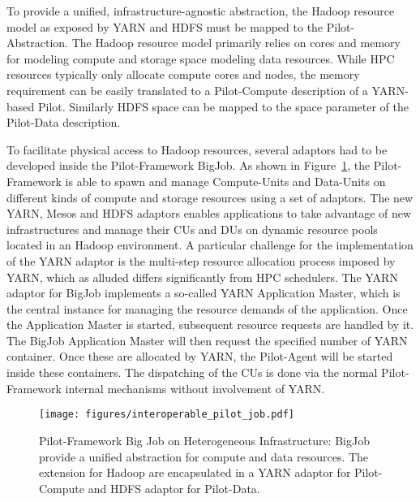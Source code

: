 \documentclass{sig-alternate}
\newcommand{\pilot}{Pilot\xspace}
\newcommand{\pilotcompute}{Pilot-Compute\xspace}
\newcommand{\pilotdata}{Pilot-Data\xspace}
\newcommand{\computeunits}{Compute-Units\xspace}
\newcommand{\dataunits}{Data-Units\xspace}
\newcommand{\dus}{DUs\xspace}
\newcommand{\cus}{CUs\xspace}
\begin{document}
To provide a unified, infrastructure-agnostic abstraction, the Hadoop resource
model as exposed by YARN and HDFS must be mapped to the \pilot-Abstraction. The
Hadoop resource model primarily relies on cores and memory for modeling compute
and storage space modeling data resources. While HPC resources typically only
allocate compute cores and nodes, the memory requirement can be easily
translated to a \pilotcompute description of a YARN-based \pilot. Similarly 
HDFS space can be mapped to the space parameter of the \pilotdata description. 



To facilitate physical access to Hadoop resources, several adaptors had to be
developed inside the \pilot-Framework BigJob. As shown in
Figure~\ref{fig:figures_interoperable_pilot_job}, the \pilot-Framework is able
to spawn and manage \computeunits and \dataunits on different kinds of compute
and storage resources using a set of adaptors. The new YARN, Mesos and HDFS
adaptors enables applications to take advantage of new infrastructures and
manage their \cus and \dus on dynamic resource pools located in an Hadoop
environment. A particular challenge for the implementation of the YARN adaptor
is the multi-step resource allocation process imposed by YARN, which as alluded
differs significantly from HPC schedulers. The YARN adaptor for BigJob
implements a so-called YARN Application Master, which is the central instance
for managing the resource demands of the application. Once the Application
Master is started, subsequent resource requests are handled by it. The BigJob
Application Master will then request the specified number of YARN container.
Once these are allocated by YARN, the \pilot-Agent will be started inside these
containers. The dispatching of the \cus is done via the normal \pilot-Framework
internal mechanisms without involvement of YARN.



\begin{figure}[t]
    \centering
    \texttt{[image: figures/interoperable\_pilot\_job.pdf]}
    \caption{\pilot-Framework Big Job on Heterogeneous Infrastructure: BigJob 
    provide a unified abstraction for compute and data resources. The extension 
    for Hadoop are encapsulated in a YARN adaptor for \pilotcompute and HDFS 
    adaptor for \pilotdata.}
    \label{fig:figures_interoperable_pilot_job}
\end{figure}
\end{document}
